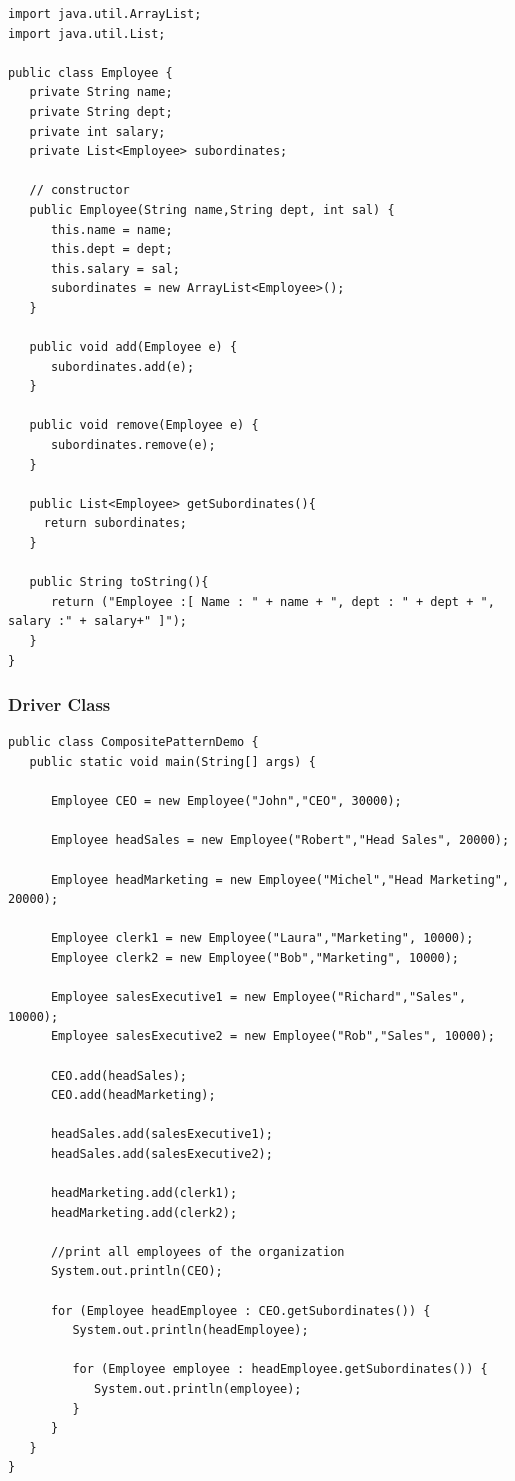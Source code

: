 \begin{verbatim}
import java.util.ArrayList;
import java.util.List;

public class Employee {
   private String name;
   private String dept;
   private int salary;
   private List<Employee> subordinates;

   // constructor
   public Employee(String name,String dept, int sal) {
      this.name = name;
      this.dept = dept;
      this.salary = sal;
      subordinates = new ArrayList<Employee>();
   }

   public void add(Employee e) {
      subordinates.add(e);
   }

   public void remove(Employee e) {
      subordinates.remove(e);
   }

   public List<Employee> getSubordinates(){
     return subordinates;
   }

   public String toString(){
      return ("Employee :[ Name : " + name + ", dept : " + dept + ", salary :" + salary+" ]");
   }   
}
\end{verbatim}

\subsubsection{Driver Class}

\begin{verbatim}
public class CompositePatternDemo {
   public static void main(String[] args) {
   
      Employee CEO = new Employee("John","CEO", 30000);

      Employee headSales = new Employee("Robert","Head Sales", 20000);

      Employee headMarketing = new Employee("Michel","Head Marketing", 20000);

      Employee clerk1 = new Employee("Laura","Marketing", 10000);
      Employee clerk2 = new Employee("Bob","Marketing", 10000);

      Employee salesExecutive1 = new Employee("Richard","Sales", 10000);
      Employee salesExecutive2 = new Employee("Rob","Sales", 10000);

      CEO.add(headSales);
      CEO.add(headMarketing);

      headSales.add(salesExecutive1);
      headSales.add(salesExecutive2);

      headMarketing.add(clerk1);
      headMarketing.add(clerk2);

      //print all employees of the organization
      System.out.println(CEO); 
      
      for (Employee headEmployee : CEO.getSubordinates()) {
         System.out.println(headEmployee);
         
         for (Employee employee : headEmployee.getSubordinates()) {
            System.out.println(employee);
         }
      }		
   }
}
\end{verbatim}

